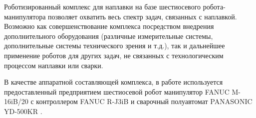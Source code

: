 Роботизированный комплекс для наплавки на базе шестиосевого робота-манипулятора позволяет охватить весь спектр задач, связанных с наплавкой.
Возможно как совершенствование комплекса посредством внедрения дополнительного оборудования (различные измерительные системы, дополнительные системы технического зрения и т.д.), так и дальнейшее применение роботов для других задач, не связанных с технологическим процессом наплавки или сварки.

В качестве аппаратной составляющей комплекса, в работе используется предоставленный предприятием шестиосевой робот манипулятор FANUC M-16iB/20 с контроллером FANUC R-J3iB и сварочный полуавтомат PANASONIC YD-500KR .
